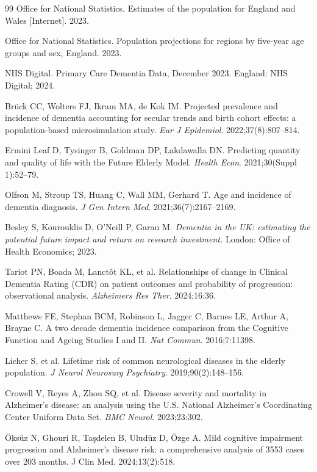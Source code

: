 \documentclass[11pt,a4paper]{article}
\begin{document}
\begin{thebibliography}{99}
 Office for National Statistics. Estimates of the population for England and Wales [Internet]. 2023.

 Office for National Statistics. Population projections for regions by five-year age groups and sex, England. 2023.

 NHS Digital. Primary Care Dementia Data, December 2023. England: NHS Digital; 2024.

 Brück CC, Wolters FJ, Ikram MA, de Kok IM. Projected prevalence and incidence of dementia accounting for secular trends and birth cohort effects: a population-based microsimulation study. \textit{Eur J Epidemiol}. 2022;37(8):807--814.

 Ermini Leaf D, Tysinger B, Goldman DP, Lakdawalla DN. Predicting quantity and quality of life with the Future Elderly Model. \textit{Health Econ}. 2021;30(Suppl 1):52--79.

 Olfson M, Stroup TS, Huang C, Wall MM, Gerhard T. Age and incidence of dementia diagnosis. \textit{J Gen Intern Med}. 2021;36(7):2167--2169.

 Besley S, Kourouklis D, O'Neill P, Garau M. \textit{Dementia in the UK: estimating the potential future impact and return on research investment.} London: Office of Health Economics; 2023.

 Tariot PN, Boada M, Lanctôt KL, et al. Relationships of change in Clinical Dementia Rating (CDR) on patient outcomes and probability of progression: observational analysis. \textit{Alzheimers Res Ther}. 2024;16:36.

 Matthews FE, Stephan BCM, Robinson L, Jagger C, Barnes LE, Arthur A, Brayne C. A two decade dementia incidence comparison from the Cognitive Function and Ageing Studies I and II. \textit{Nat Commun}. 2016;7:11398.

 Licher S, et al. Lifetime risk of common neurological diseases in the elderly population. \textit{J Neurol Neurosurg Psychiatry}. 2019;90(2):148--156.

 Crowell V, Reyes A, Zhou SQ, et al. Disease severity and mortality in Alzheimer's disease: an analysis using the U.S. National Alzheimer's Coordinating Center Uniform Data Set. \textit{BMC Neurol}. 2023;23:302.

 Öksüz N, Ghouri R, Taşdelen B, Uludüz D, Özge A. Mild cognitive impairment progression and Alzheimer's disease risk: a comprehensive analysis of 3553 cases over 203 months. J Clin Med. 2024;13(2):518.


\end{thebibliography}
\end{document}
